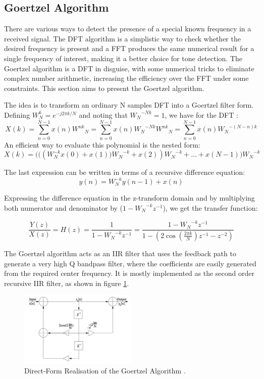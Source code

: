 \documentclass[12pt,a4paper,openright]{article}
\begin{document}
\subsection{Goertzel Algorithm}
\label{sec:FSKdemod}
There are various ways to detect the presence of a special known frequency in a received signal. The DFT algorithm is a simplistic way to check whether the desired frequency is present and a FFT produces the same numerical result for a single frequency of interest, making it a better choice for tone detection. The Goertzel algorithm is a DFT in disguise, with some numerical tricks to eliminate complex number arithmetic, increasing the efficiency over the FFT under some constraints. This section aims to present the Goertzel algorithm.

The idea is to transform an ordinary N samples DFT into a Goertzel filter form. Defining $W_{N}^{k}={e^{ - j2\pi k/N}}$ and noting that ${W_N}^{ - Nk} = 1$, we have for the DFT \cite{GoertzelPaper}:
\[X(k) = \sum\limits_{n = 0}^{N - 1} {x(n){W^{nk}}_N}  = \sum\limits_{n = 0}^{N - 1} {x(n){W_N}^{ - Nk}{W^{nk}}_N}  = \sum\limits_{n = 0}^{N - 1} {x(n){W_N}^{ - (N - n)k}} \]
An efficient way to evaluate this polynomial is the nested form:
\[X(k)=\bigg(\big(({W^{ - k}_N}x(0) + x(1)\big){W_N}^{ - k} + x(2)){W_N}^{ - k} + ... + x(N - 1)\bigg){W_N}^{ - k}\]

The last expression can be written in terms of a recursive difference equation:
\[y(n) = {W^{ - k}_N}y(n - 1) + x(n)\]

Expressing the difference equation in the z-transform domain and by multiplying both numerator and denominator by (${1 - {W_N}^{ - k}{z^{ - 1}}}$), we get the transfer function:

\[\frac{{Y(z)}}{{X(z)}} = H(z) = \frac{1}{{1 - {W_N}^{ - k}{z^{ - 1}}}} = \frac{{1 - {W_N}^{ - k}{z^{ - 1}}}}{{1 - (2\cos (\frac{{2\pi k}}{N}){z^{ - 1}} - {z^{ - 2}})}}\]

The Goertzel algorithm acts as an IIR filter that uses the feedback path to generate a very high Q bandpass filter, where the coefficients are easily generated from the required center frequency.  It is mostly implemented as the second order recursive IIR filter, as shown in figure \ref{fig:IIR}. 
 \begin{figure}[h]
  \centering
    \includegraphics[width=0.5\textwidth]{IIR.pdf}
    \caption{Direct-Form Realisation of the Goertzel Algorithm \protect\cite{HaykinBook}.}
    \label{fig:IIR}
\end{figure}
\end{document}

